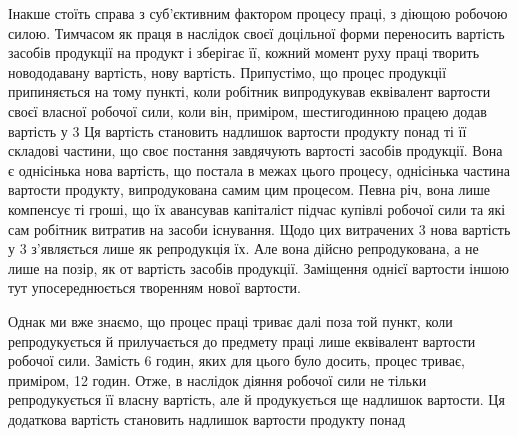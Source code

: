 Інакше стоїть справа з суб’єктивним фактором процесу праці,
з діющою робочою силою. Тимчасом як праця в наслідок своєї
доцільної форми переносить вартість засобів продукції на продукт
і зберігає її, кожний момент руху праці творить новододавану вартість,
нову вартість. Припустімо, що процес продукції припиняється
на тому пункті, коли робітник випродукував еквівалент
вартости своєї власної робочої сили, коли він, приміром, шестигодинною
працею додав вартість у 3 Ця вартість становить
надлишок вартости продукту понад ті її складові частини,
що своє постання завдячують вартості засобів продукції. Вона є
однісінька нова вартість, що постала в межах цього процесу,
однісінька частина вартости продукту, випродукована самим цим
процесом. Певна річ, вона лише компенсує ті гроші, що їх авансував
капіталіст підчас купівлі робочої сили та які сам робітник
витратив на засоби існування. Щодо цих витрачених 3
нова вартість у 3 з’являється лише як репродукція їх.
Але вона дійсно репродукована, а не лише на позір, як от вартість
засобів продукції. Заміщення однієї вартости іншою тут упосереднюється
творенням нової вартости.

Однак ми вже знаємо, що процес праці триває далі поза той
пункт, коли репродукується й прилучається до предмету праці
лише еквівалент вартости робочої сили. Замість 6 годин, яких
для цього було досить, процес триває, приміром, 12 годин. Отже,
в наслідок діяння робочої сили не тільки репродукується її власну
вартість, але й продукується ще надлишок вартости. Ця додаткова
вартість становить надлишок вартости продукту понад
\parbreak{}  %
